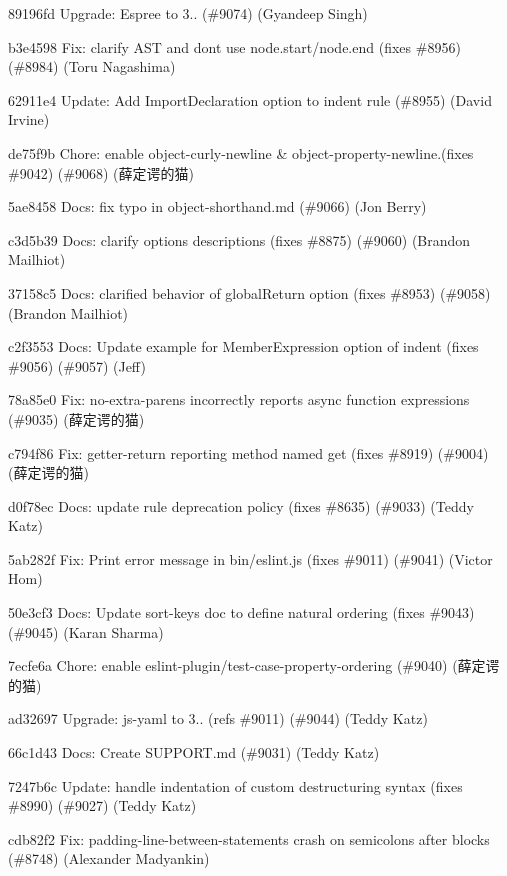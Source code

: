 \begin{DoxyItemize}
\item 89196fd Upgrade\+: Espree to 3.. (\#9074) (Gyandeep Singh)
\item b3e4598 Fix\+: clarify AST and don\textquotesingle{}t use {\ttfamily node.\+start}/{\ttfamily node.\+end} (fixes \#8956) (\#8984) (Toru Nagashima)
\item 62911e4 Update\+: Add Import\+Declaration option to indent rule (\#8955) (David Irvine)
\item de75f9b Chore\+: enable object-\/curly-\/newline \& object-\/property-\/newline.(fixes \#9042) (\#9068) (薛定谔的猫)
\item 5ae8458 Docs\+: fix typo in object-\/shorthand.\+md (\#9066) (Jon Berry)
\item c3d5b39 Docs\+: clarify options descriptions (fixes \#8875) (\#9060) (Brandon Mailhiot)
\item 37158c5 Docs\+: clarified behavior of global\+Return option (fixes \#8953) (\#9058) (Brandon Mailhiot)
\item c2f3553 Docs\+: Update example for Member\+Expression option of indent (fixes \#9056) (\#9057) (Jeff)
\item 78a85e0 Fix\+: no-\/extra-\/parens incorrectly reports async function expressions (\#9035) (薛定谔的猫)
\item c794f86 Fix\+: getter-\/return reporting method named \textquotesingle{}get\textquotesingle{} (fixes \#8919) (\#9004) (薛定谔的猫)
\item d0f78ec Docs\+: update rule deprecation policy (fixes \#8635) (\#9033) (Teddy Katz)
\item 5ab282f Fix\+: Print error message in bin/eslint.\+js (fixes \#9011) (\#9041) (Victor Hom)
\item 50e3cf3 Docs\+: Update sort-\/keys doc to define natural ordering (fixes \#9043) (\#9045) (Karan Sharma)
\item 7ecfe6a Chore\+: enable eslint-\/plugin/test-\/case-\/property-\/ordering (\#9040) (薛定谔的猫)
\item ad32697 Upgrade\+: js-\/yaml to 3.. (refs \#9011) (\#9044) (Teddy Katz)
\item 66c1d43 Docs\+: Create SUPPORT.\+md (\#9031) (Teddy Katz)
\item 7247b6c Update\+: handle indentation of custom destructuring syntax (fixes \#8990) (\#9027) (Teddy Katz)
\item cdb82f2 Fix\+: padding-\/line-\/between-\/statements crash on semicolons after blocks (\#8748) (Alexander Madyankin)

\end{DoxyItemize}
